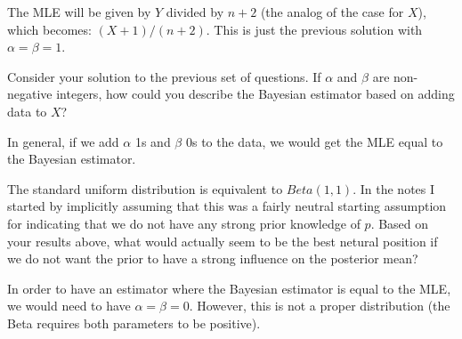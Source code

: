
The MLE will be given by $Y$ divided by $n+2$ (the analog of the case for $X$),
which becomes: $(X+1)/(n+2)$. This is just the previous solution with
$\alpha = \beta = 1$.


Consider your solution to the previous set of questions. If $\alpha$ and $\beta$
are non-negative integers, how could you describe the Bayesian estimator based
on adding data to $X$? 


In general, if we add $\alpha$ 1s and $\beta$ 0s to the data, we would get the
MLE equal to the Bayesian estimator.


The standard uniform distribution is equivalent to $Beta(1, 1)$. In the notes
I started by implicitly assuming that this was a fairly neutral starting
assumption for indicating that we do not have any strong prior knowledge of
$p$. Based on your results above, what would actually seem to be the best
netural position if we do not want the prior to have a strong influence on 
the posterior mean?


In order to have an estimator where the Bayesian estimator is equal to the MLE,
we would need to have $\alpha = \beta = 0$. However, this is not a proper
distribution (the Beta requires both parameters to be positive).
